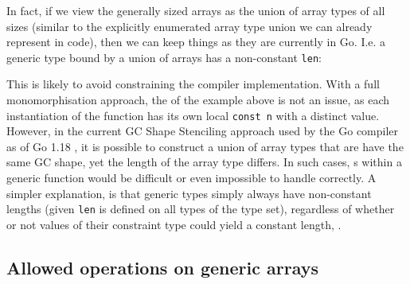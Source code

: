 
In fact, if we view the generally sized arrays as the union of array types of
all sizes (similar to the explicitly enumerated array type union we can already
represent in code), then we can keep things as they are currently in Go. I.e. a
generic type bound by a union of arrays has a non-constant \texttt{len}:


This is likely to avoid constraining the compiler implementation. With a full
monomorphisation approach, the  of the example above is not an issue,
as each instantiation of the function has its own local \texttt{const n} with a
distinct value. However, in the current GC Shape Stenciling approach used by the
Go compiler as of Go 1.18 \autocite{generics1.18}, it is possible to construct a
union of array types that are have the same GC shape, yet the length of the
array type differs. In such cases, s within a generic function would
be difficult or even impossible to handle correctly. A simpler explanation, is
that generic types simply always have non-constant lengths (given \texttt{len}
is defined on all types of the type set), regardless of whether or not values of
their constraint type could yield a constant length, \autocite{spec}.

\subsection{Allowed operations on generic arrays}


% 
% 


